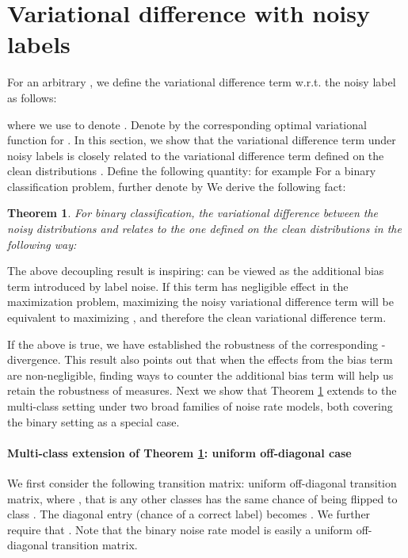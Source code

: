 \documentclass{article}
\newtheorem{theorem}{Theorem}
\begin{document}
\section{Variational difference with noisy labels}
\label{sec:vd}

 For an arbitrary , we define the variational difference term w.r.t. the noisy label as follows:

where we use  to denote . Denote by  the corresponding optimal variational function  for . In this section, we show that the variational difference term under noisy labels is closely related to the variational difference term defined on the clean distributions . Define the following quantity:
\underline{}
for example  
For a binary classification problem, further denote by \underline{
}
We derive the following fact:
\begin{theorem}\label{thm:variational}
For binary classification, the variational difference between the noisy distributions  and  relates to the one defined on the clean distributions in the following way:

\end{theorem}

The above decoupling result is inspiring:  can be viewed as the additional bias term introduced by label noise. If this term has negligible effect in the maximization problem, maximizing the noisy variational difference term will be equivalent to maximizing , and therefore the clean variational difference term. 

If the above is true, we have established the robustness of the corresponding -divergence. This result also points out that when the effects from the bias term are non-negligible, finding ways to counter the additional bias term will help us retain the robustness of  measures. Next we show that Theorem \ref{thm:variational} extends to the multi-class setting under two broad families of noise rate models, both covering the binary setting as a special case.

\paragraph{Multi-class extension of Theorem \ref{thm:variational}: uniform off-diagonal case}
We first consider the following transition matrix: uniform off-diagonal transition matrix, where , that is any other classes  has the same chance of being flipped to class . The diagonal entry  (chance of a correct label) becomes . We further require that . Note that the binary noise rate model is easily a uniform off-diagonal  transition matrix. 
\end{document}
